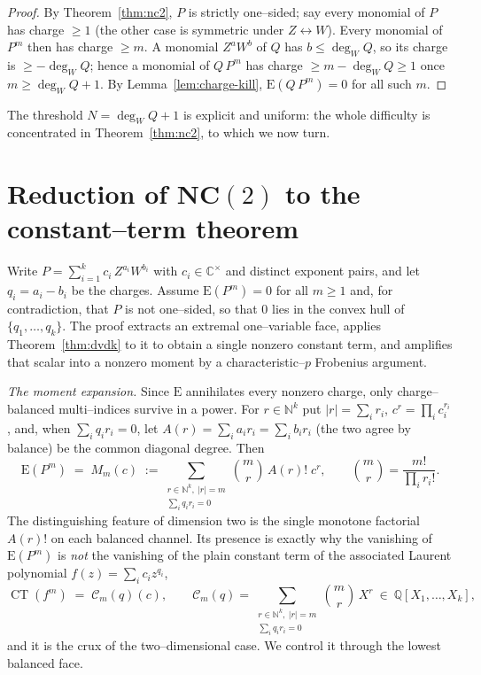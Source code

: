 \documentclass[11pt,reqno]{amsart}
\theoremstyle{plain}
\theoremstyle{definition}
\newcommand{\C}{\mathbb{C}}
\newcommand{\Q}{\mathbb{Q}}
\newcommand{\N}{\mathbb{N}}
\newcommand{\E}{\mathrm{E}}
\newcommand{\CT}{\operatorname{CT}}
\begin{document}
\begin{proof}
By Theorem~\ref{thm:nc2}, $P$ is strictly one--sided; say every monomial of $P$ has charge $\ge1$
(the other case is symmetric under $Z\leftrightarrow W$). Every monomial of $P^m$ then has charge
$\ge m$. A monomial $Z^{a}W^{b}$ of $Q$ has $b\le \deg_W Q$, so its charge is $\ge -\deg_W Q$; hence a
monomial of $Q\,P^m$ has charge $\ge m-\deg_W Q\ge 1$ once $m\ge \deg_W Q+1$. By
Lemma~\ref{lem:charge-kill}, $\E(Q\,P^m)=0$ for all such $m$.
\end{proof}

The threshold $N=\deg_W Q+1$ is explicit and uniform: the whole difficulty is concentrated in
Theorem~\ref{thm:nc2}, to which we now turn.

\section{Reduction of NC$(2)$ to the constant--term theorem}\label{sec:nc2}

Write $P=\sum_{i=1}^{k} c_i\,Z^{a_i}W^{b_i}$ with $c_i\in\C^\times$ and distinct exponent pairs, and let
$q_i=a_i-b_i$ be the charges. Assume $\E(P^m)=0$ for all $m\ge1$ and, for contradiction, that $P$ is not
one--sided, so that $0$ lies in the convex hull of $\{q_1,\dots,q_k\}$. The proof extracts an extremal
one--variable face, applies Theorem~\ref{thm:dvdk} to it to obtain a single nonzero constant term, and
amplifies that scalar into a nonzero moment by a characteristic--$p$ Frobenius argument.

\smallskip\noindent\emph{The moment expansion.} Since $\E$ annihilates every nonzero charge, only
charge--balanced multi--indices survive in a power. For $r\in\N^k$ put $|r|=\sum_i r_i$,
$c^r=\prod_i c_i^{r_i}$, and, when $\sum_i q_i r_i=0$, let $A(r)=\sum_i a_i r_i=\sum_i b_i r_i$ (the two
agree by balance) be the common diagonal degree. Then
\begin{equation}\label{eq:wick}
  \E(P^m)\;=\;M_m(c)\;:=\!\!\sum_{\substack{r\in\N^k,\ |r|=m\\ \sum_i q_i r_i=0}}\!\!
      \binom{m}{r}\,A(r)!\;c^r,\qquad \binom{m}{r}=\frac{m!}{\prod_i r_i!}.
\end{equation}
The distinguishing feature of dimension two is the single monotone factorial $A(r)!$ on each balanced
channel. Its presence is exactly why the vanishing of $\E(P^m)$ is \emph{not} the vanishing of the plain
constant term of the associated Laurent polynomial $f(z)=\sum_i c_i z^{q_i}$,
\begin{equation}\label{eq:ctr}
  \CT(f^m)\;=\;\mathcal C_m(q)(c),\qquad
  \mathcal C_m(q)=\!\!\sum_{\substack{r\in\N^k,\ |r|=m\\ \sum_i q_i r_i=0}}\!\!\binom{m}{r}\,X^{r}
  \ \in\ \Q[X_1,\dots,X_k],
\end{equation}
and it is the crux of the two--dimensional case. We control it through the lowest balanced face.
\end{document}

